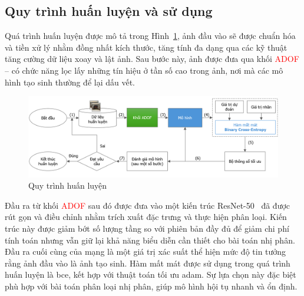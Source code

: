 \subsection{Quy trình huấn luyện và sử dụng}
%
\label{ssec:quy_trinh_huan_luyen}
%
Quá trình huấn luyện được mô tả trong Hình~\ref{fig:offline-training-process}, ảnh đầu vào sẽ được chuẩn hóa và tiền xử lý nhằm đồng nhất kích thước, tăng tính đa dạng qua các kỹ thuật tăng cường dữ liệu xoay và lật ảnh. Sau bước này, ảnh được đưa qua khối \textcolor{red}{ADOF} – có chức năng lọc lấy những tín hiệu ở tần số cao trong ảnh, nơi mà các mô hình tạo sinh thường để lại dấu vết.
%
\begin{figure}[h!]
	\centering
	\includegraphics[width=1.0\linewidth]{Images/offline-training-process.png}
	\begin{minipage}{1.0\linewidth}
		\vspace{3mm}
		\caption{Quy trình huấn luyện}
		\label{fig:offline-training-process}
	\end{minipage}
\end{figure}
%
Đầu ra từ khối \textcolor{red}{ADOF} sau đó được đưa vào một kiến trúc ResNet-50~\cite{He2015DeepRL} đã được rút gọn và điều chỉnh nhằm trích xuất đặc trưng và thực hiện phân loại. Kiến trúc này được giảm bớt số lượng tầng so với phiên bản đầy đủ để giảm chi phí tính toán nhưng vẫn giữ lại khả năng biểu diễn cần thiết cho bài toán nhị phân. Đầu ra cuối cùng của mạng là một giá trị xác suất thể hiện mức độ tin tưởng rằng ảnh đầu vào là ảnh tạo sinh. Hàm mất mát được sử dụng trong quá trình huấn luyện là \gls{bce}, kết hợp với thuật toán tối ưu \gls{adam}. Sự lựa chọn này đặc biệt phù hợp với bài toán phân loại nhị phân, giúp mô hình hội tụ nhanh và ổn định. 

